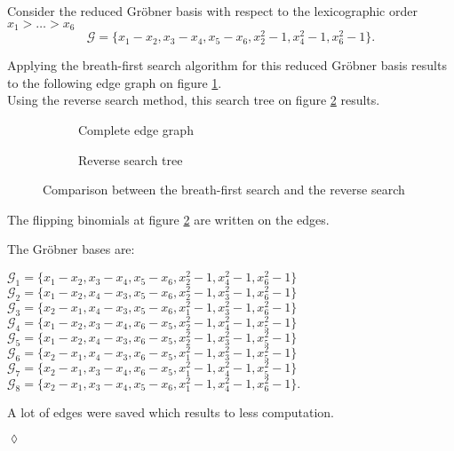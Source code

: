 \begin{env_example}\normalfont
Consider the reduced Gröbner basis with respect to the lexicographic order $x_{1} > \ldots > x_{6} $
\[ \mathcal{G} = \{x_{1} - x_{2}, x_{3} - x_{4}, x_{5}-x_{6} , x_{2}^{2} -1 , x_{4}^{2} - 1, x_{6}^{2} - 1 \}. \]

Applying the breath-first search algorithm for this reduced Gröbner basis results to the following edge graph on figure \ref{fig:breadth}.\\
Using the reverse search method, this search tree on figure \ref{fig:reverse} results.


\begin{figure}[h]
    \centering
    \begin{subfigure}[b]{0.48\linewidth}        %
        \centering
        
        \caption{Complete edge graph}
        \label{fig:breadth}
    \end{subfigure}
    \begin{subfigure}[b]{0.48\linewidth}        %
        \centering
        
        \caption{Reverse search tree}
        \label{fig:reverse}
    \end{subfigure}
    \caption{Comparison between the breath-first search and the reverse search}
    \label{fig:graph}
\end{figure}
\newpage
The flipping binomials at figure \ref{fig:reverse} are written on the edges.

The Gröbner bases are:
\begin{center}
$\mathcal{G}_{1} = \{x_{1}-x_{2},x_{3}-x_{4},x_{5}-x_{6},x_{2}^{2}-1,x_{4}^{2}-1,x_{6}^{2}-1 \} $ \\
$\mathcal{G}_{2} = \{x_{1}-x_{2},x_{4}-x_{3},x_{5}-x_{6},x_{2}^{2}-1,x_{3}^{2}-1,x_{6}^{2}-1 \} $ \\
$\mathcal{G}_{3} = \{x_{2}-x_{1},x_{4}-x_{3},x_{5}-x_{6},x_{1}^{2}-1,x_{3}^{2}-1,x_{6}^{2}-1 \} $ \\
$\mathcal{G}_{4} = \{x_{1}-x_{2},x_{3}-x_{4},x_{6}-x_{5},x_{2}^{2}-1,x_{4}^{2}-1,x_{5}^{2}-1 \} $ \\
$\mathcal{G}_{5} = \{x_{1}-x_{2},x_{4}-x_{3},x_{6}-x_{5},x_{2}^{2}-1,x_{3}^{2}-1,x_{5}^{2}-1 \} $ \\
$\mathcal{G}_{6} = \{x_{2}-x_{1},x_{4}-x_{3},x_{6}-x_{5},x_{1}^{2}-1,x_{3}^{2}-1,x_{5}^{2}-1 \} $ \\
$\mathcal{G}_{7} = \{x_{2}-x_{1},x_{3}-x_{4},x_{6}-x_{5},x_{1}^{2}-1,x_{4}^{2}-1,x_{5}^{2}-1 \} $ \\
$\mathcal{G}_{8} = \{x_{2}-x_{1},x_{3}-x_{4},x_{5}-x_{6},x_{1}^{2}-1,x_{4}^{2}-1,x_{6}^{2}-1 \}. $ \\
\end{center}

A lot of edges were saved which results to less computation.
\begin{flushright}
$\lozenge$
\end{flushright}
\end{env_example}




